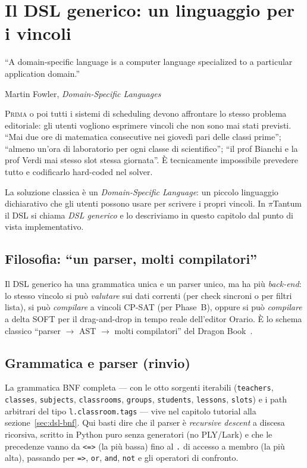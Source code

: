 \chapter{Il DSL generico: un linguaggio per i vincoli}
\label{ch:metodo_dsl}

\epigraph{``A domain-specific language is a computer
language specialized to a particular application
domain.''}{Martin Fowler, \emph{Domain-Specific
Languages}~\parencite{fowler2010}}

\lettrine[lines=3]{P}{rima} o poi tutti i sistemi di
scheduling devono affrontare lo stesso problema editoriale:
gli utenti vogliono esprimere vincoli che non sono mai
stati previsti. ``Mai due ore di matematica consecutive nei
gioved\`i pari delle classi prime''; ``almeno un'ora di
laboratorio per ogni classe di scientifico''; ``il prof
Bianchi e la prof Verdi mai stesso slot stessa giornata''.
\`E tecnicamente impossibile prevedere tutto e codificarlo
hard-coded nel solver.

La soluzione classica \`e un \emph{Domain-Specific
Language}: un piccolo linguaggio dichiarativo che
gli utenti possono usare per scrivere i propri vincoli. In
$\pi$Tantum il DSL si chiama \emph{DSL generico} e lo
descriviamo in questo capitolo dal punto di vista
implementativo.

\section{Filosofia: ``un parser, molti compilatori''}

\begin{ideabox}
Il DSL generico ha una grammatica unica e un parser unico,
ma ha pi\`u \emph{back-end}: lo stesso vincolo si pu\`o
\emph{valutare} sui dati correnti (per check sincroni o per
filtri lista), si pu\`o \emph{compilare} a vincoli CP-SAT
(per Phase~B), oppure si pu\`o \emph{compilare} a delta SOFT
per il drag-and-drop in tempo reale dell'editor Orario.
\`E lo schema classico ``parser $\to$ AST $\to$ molti
compilatori'' del Dragon Book~\parencite{aho2006}.
\end{ideabox}

\section{Grammatica e parser (rinvio)}

La grammatica BNF completa --- con le otto sorgenti
iterabili (\texttt{teachers}, \texttt{classes},
\texttt{subjects}, \texttt{classrooms}, \texttt{groups},
\texttt{students}, \texttt{lessons}, \texttt{slots}) e i path
arbitrari del tipo \texttt{l.classroom.tags} --- vive nel
capitolo tutorial alla
sezione~\ref{sec:dsl-bnf}. Qui basti dire che il
parser \`e \emph{recursive descent} a discesa ricorsiva, scritto
in Python puro senza generatori (no PLY/Lark) e che le
precedenze vanno da \texttt{<=>} (la pi\`u bassa) fino al
\texttt{.} di accesso a membro (la pi\`u alta), passando per
\texttt{=>}, \texttt{or}, \texttt{and}, \texttt{not} e gli
operatori di confronto.

